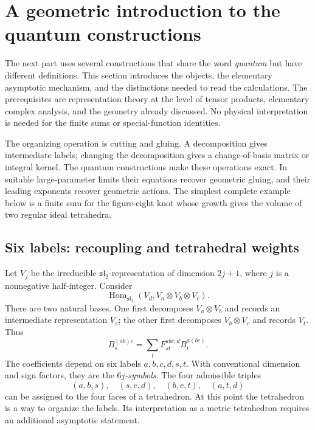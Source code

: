 \section{A geometric introduction to the quantum constructions}
\label{sec:quantumintro}

The next part uses several constructions that share the word
\emph{quantum} but have different definitions. This section introduces
the objects, the elementary asymptotic mechanism, and the distinctions
needed to read the calculations. The prerequisites are representation
theory at the level of tensor products, elementary complex analysis,
and the geometry already discussed. No physical interpretation is
needed for the finite sums or special-function identities.

The organizing operation is cutting and gluing. A decomposition gives
intermediate labels; changing the decomposition gives a change-of-basis
matrix or integral kernel. The quantum constructions make these
operations exact. In suitable large-parameter limits their equations
recover geometric gluing, and their leading exponents recover geometric
actions. The simplest complete example below is a finite sum for the
figure-eight knot whose growth gives the volume of two regular ideal
tetrahedra.

\subsection{Six labels: recoupling and tetrahedral weights}
\label{sec:introrecoupling}

Let $V_j$ be the irreducible $\mathfrak{sl}_2$-representation of dimension
$2j+1$, where $j$ is a nonnegative half-integer. Consider
\[
 \operatorname{Hom}_{\mathfrak{sl}_2}(V_d,V_a\otimes V_b\otimes V_c).
\]
There are two natural bases. One first decomposes $V_a\otimes V_b$
and records an intermediate representation $V_s$; the other first
decomposes $V_b\otimes V_c$ and records $V_t$. Thus
\begin{equation}
 B_s^{(ab)c}=\sum_t F_{st}^{abc;d}B_t^{a(bc)}.
 \label{eq:introrecoupling}
\end{equation}
The coefficients depend on six labels $a,b,c,d,s,t$. With conventional
dimension and sign factors, they are the \emph{$6j$-symbols}. The
four admissible triples
\[
 (a,b,s),\quad(s,c,d),\quad(b,c,t),\quad(a,t,d)
\]
can be assigned to the four faces of a tetrahedron. At this point the
tetrahedron is a way to organize the labels. Its interpretation as a
metric tetrahedron requires an additional asymptotic statement.


